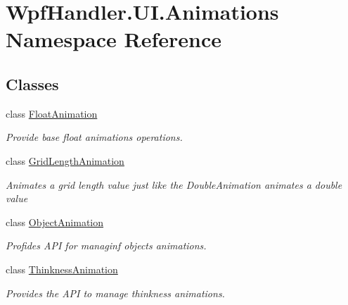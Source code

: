 \hypertarget{namespace_wpf_handler_1_1_u_i_1_1_animations}{}\section{Wpf\+Handler.\+U\+I.\+Animations Namespace Reference}
\label{namespace_wpf_handler_1_1_u_i_1_1_animations}
\subsection*{Classes}
\begin{DoxyCompactItemize}
\item 
class \mbox{\hyperlink{class_wpf_handler_1_1_u_i_1_1_animations_1_1_float_animation}{Float\+Animation}}
\begin{DoxyCompactList}\small\item\em Provide base float animations operations. \end{DoxyCompactList}\item 
class \mbox{\hyperlink{class_wpf_handler_1_1_u_i_1_1_animations_1_1_grid_length_animation}{Grid\+Length\+Animation}}
\begin{DoxyCompactList}\small\item\em Animates a grid length value just like the Double\+Animation animates a double value \end{DoxyCompactList}\item 
class \mbox{\hyperlink{class_wpf_handler_1_1_u_i_1_1_animations_1_1_object_animation}{Object\+Animation}}
\begin{DoxyCompactList}\small\item\em Profides A\+PI for managinf objects animations. \end{DoxyCompactList}\item 
class \mbox{\hyperlink{class_wpf_handler_1_1_u_i_1_1_animations_1_1_thinkness_animation}{Thinkness\+Animation}}
\begin{DoxyCompactList}\small\item\em Provides the A\+PI to manage thinkness animations. \end{DoxyCompactList}\end{DoxyCompactItemize}
